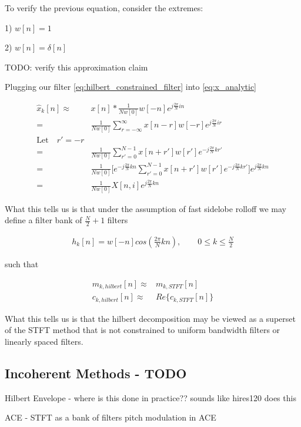 \documentclass [11pt, proquest] {uwthesis}[2015/03/03]
\begin{document}
To verify the previous equation, consider the extremes:

1) $w[n] = 1$

2) $w[n] = \delta[n]$

TODO: verify this approximation claim

Plugging our filter \ref{eq:hilbert_constrained_filter} into \ref{eq:x_analytic}

\begin{align}
\widehat{x}_k[n] \approx& x[n] * \frac{1}{Nw[0]}w[-n]e^{j\frac{2\pi}{N}in} \nonumber \\
=& \frac{1}{Nw[0]}\sum\limits_{r=-\infty}^{\infty}x[n - r] w[-r] e^{j\frac{2\pi}{N}ir} \nonumber \\
\textrm{Let} \quad r' = -r \nonumber \\
=& \frac{1}{Nw[0]}\sum\limits_{r'=0}^{N-1} x[n + r'] w[r'] e^{-j\frac{2\pi}{N}kr'} \nonumber \\
=& \frac{1}{Nw[0]}\bigg[e^{-j\frac{2\pi}{N}kn} \sum\limits_{r'=0}^{N-1} x[n + r'] w[r'] e^{-j\frac{2\pi}{N}kr'}\bigg]e^{j\frac{2\pi}{N}kn} \nonumber \\
=& \frac{1}{Nw[0]}X[n,i]e^{j\frac{2\pi}{N}kn}
\end{align}

What this tells us is that under the assumption of fast sidelobe rolloff we may define a filter bank of $\frac{N}{2} + 1$ filters

\begin{align}
h_k[n] = w[-n]cos(\frac{2\pi}{N}kn), \qquad 0 \leq k \leq \frac{N}{2}
\end{align}

such that

\begin{align}
m_{k,hilbert}[n] \approx& m_{k,STFT}[n] \\
c_{k,hilbert}[n] \approx& Re\{c_{k,STFT}[n]\}
\end{align}

What this tells us is that the hilbert decomposition may be viewed as a superset of the STFT method that is not constrained to uniform bandwidth filters or linearly spaced filters.

\subsection{Incoherent Methods - TODO}

Hilbert Envelope - where is this done in practice??
    sounds like hires120 does this

ACE - STFT as a bank of filters
pitch modulation in ACE
\end{document}
